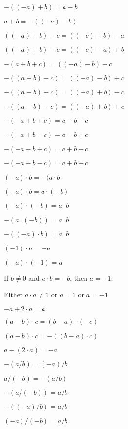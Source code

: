 \documentclass{article}
\begin{document}
\begin{thm}
\item\label{xcmplx1:162} $-((-a)+b)=a-b$
\item\label{xcmplx1:163} $a+b=-((-a)-b)$
\item\label{xcmplx1:164} $((-a)+b)-c=((-c)+b)-a$
  \bigbreak
\item\label{xcmplx1:165} $((-a)+b)-c = ((-c)-a)+b$
\item\label{xcmplx1:166} $-(a+b+c)=((-a)-b)-c$
\item\label{xcmplx1:167} $-((a+b)-c)=((-a)-b)+c$
\item\label{xcmplx1:168} $-((a-b)+c)=((-a)+b)-c$
\item\label{xcmplx1:169} $-((a-b)-c)=((-a)+b)+c$
\item\label{xcmplx1:170} $-(-a+b+c)=a-b-c$
\item\label{xcmplx1:171} $-(-a+b-c)=a-b+c$
\item\label{xcmplx1:172} $-(-a-b+c)=a+b-c$
\item\label{xcmplx1:173} $-(-a-b-c)=a+b+c$
  \bigbreak
\item\label{xcmplx1:174} $(-a)\cdot b=-(a\cdot b$
\item\label{xcmplx1:175} $(-a)\cdot b=a\cdot(-b)$
\item\label{xcmplx1:176} $(-a)\cdot(-b)=a\cdot b$
\item\label{xcmplx1:177} $-(a\cdot(-b))=a\cdot b$
\item\label{xcmplx1:178} $-((-a)\cdot b)=a\cdot b$
\item\label{xcmplx1:179} $(-1)\cdot a=-a$
\item\label{xcmplx1:180} $(-a)\cdot(-1)=a$
\item\label{xcmplx1:181} If $b\neq0$ and $a\cdot b=-b$, then $a=-1$.
  \bigbreak
\item\label{xcmplx1:182} Either $a\cdot a\neq1$ or $a=1$ or $a=-1$
\item\label{xcmplx1:183} $-a+2\cdot a=a$
\item\label{xcmplx1:184} $(a-b)\cdot c=(b-a)\cdot(-c)$
\item\label{xcmplx1:185} $(a-b)\cdot c=-((b-a)\cdot c)$
\item\label{xcmplx1:186} $a-(2\cdot a)=-a$
  \bigbreak
\item\label{xcmplx1:187} $-(a/b)=(-a)/b$
\item\label{xcmplx1:188} $a/(-b)=-(a/b)$
\item\label{xcmplx1:189} $-(a/(-b))=a/b$
\item\label{xcmplx1:190} $-((-a)/b)=a/b$
\item\label{xcmplx1:191} $(-a)/(-b)=a/b$

\end{thm}
\end{document}
